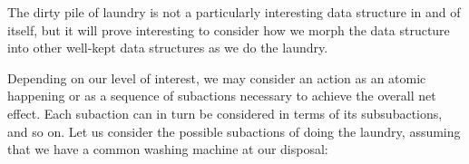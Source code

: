 




The dirty pile of laundry is not a particularly interesting data structure in
and of itself, but it will prove interesting to consider how we morph the data
structure into other well-kept data structures as we do the laundry.

Depending on our level of interest, we may consider an action as an atomic
happening or as a sequence of subactions necessary to achieve the overall net
effect. Each subaction can in turn be considered in terms of its subsubactions,
and so on. Let us consider the possible subactions of doing the laundry,
assuming that we have a common washing machine at our disposal:

